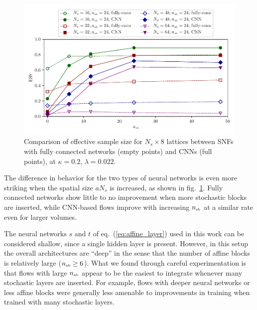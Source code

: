 \documentclass[11pt]{article}
\newcommand{\nab}{n_{\mbox{\tiny{ab}}}}
\newcommand{\nsb}{n_{\mbox{\tiny{sb}}}}
\begin{document}
\begin{figure}[!htb]
\begin{center}
\includegraphics*[width=\textwidth]{ESS_vol_cnn_mlp.pdf}
\caption{Comparison of effective sample size for $N_s \times 8$ lattices between SNFs with fully connected networks (empty points) and CNNs (full points), at $\kappa=0.2$, $\lambda=0.022$. \label{fig:ESS_vol_cnn_mlp}}
\end{center}
\end{figure}

The difference in behavior for the two types of neural networks is even more striking when the spatial size $a N_s$ is increased, as shown in fig.~\ref{fig:ESS_vol_cnn_mlp}. Fully connected networks show little to no improvement when more stochastic blocks are inserted, while CNN-based flows improve with increasing $\nsb$ at a similar rate even for larger volumes.

The neural networks $s$ and $t$ of eq.~(\ref{eq:affine_layer}) used in this work can be considered shallow, since a single hidden layer is present. However, in this setup the overall architectures are ``deep'' in the sense that the number of affine blocks is relatively large ($\nab \geq 6$). What we found through careful experimentation is that flows with large $\nab$ appear to be the easiest to integrate whenever many stochastic layers are inserted. For example, flows with deeper neural networks or less affine blocks were generally less amenable to improvements in training when trained with many stochastic layers.
\end{document}
